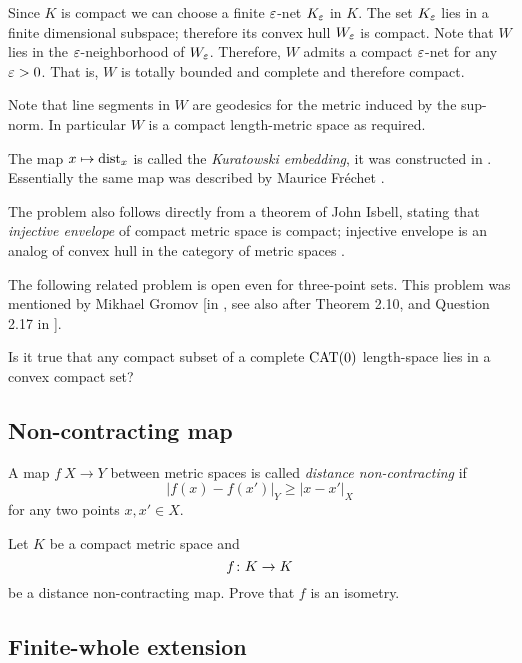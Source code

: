 Since $K$ is compact we can choose a finite $\varepsilon$-net $K_\varepsilon$ in $K$.
The set $K_\varepsilon$ lies in a finite dimensional subspace;
therefore its convex hull $W_\varepsilon$ is compact.
Note that $W$ lies in the $\varepsilon$-neighborhood of $W_\varepsilon$.
Therefore, $W$ admits a compact $\varepsilon$-net for any $\varepsilon>0$.
That is, $W$ is totally bounded and complete and therefore compact.

Note that line segments in $W$ are geodesics for the metric induced by the sup-norm. 
In particular $W$ is a compact length-metric space as required.
\qeds

The map $x\mapsto \operatorname{\rm dist}\nolimits_x$ is called the \emph{Kuratowski embedding},
it was constructed in \cite{kuratowski}.
Essentially the same map 
was described by Maurice Fr\'echet \cite[in][this is the paper where metric spaces were introduced]{frechet}.

The problem also follows directly from a theorem of John Isbell, stating that \emph{injective envelope} of compact metric space is compact;
injective envelope is an analog of convex hull in the category of metric spaces
\cite[see 2.11 in][]{isbell}.

The following related problem is open even for three-point sets.
This problem was mentioned by Mikhael Gromov [in ,
see also  after Theorem 2.10,  and Question 2.17 in ].

\begin{pr}
Is it true that any compact subset of a complete $\operatorname{\rm CAT}\nolimits(0)$ length-space lies in a convex compact set?
\end{pr}


\subsection*{Non-contracting map\easy}
\label{Noncontracting map}

A map $f\: X\to Y$ between metric spaces is called \emph{distance non-contracting} if
\[|f(x)-f(x')|_Y\ge |x-x'|_X\]
for any two points $x,x'\in X$.

\begin{pr}
Let $K$  be a compact metric space and
\[f\:K\z\to K\] 
be a distance non-contracting map.
Prove that $f$ is an isometry.
\end{pr}

\subsection*{Finite-whole extension}
\label{Finite-whole extension}

